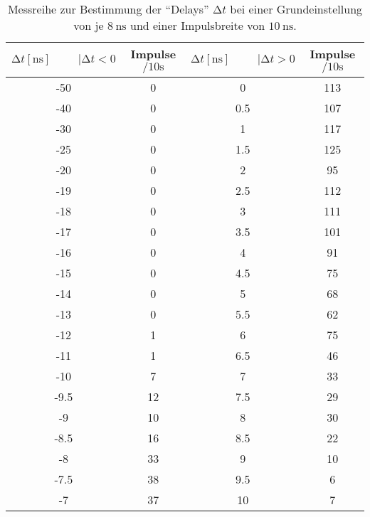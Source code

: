 \begin{table}
    \centering
    \caption{Messreihe zur Bestimmung der \enquote{Delays} $\increment t$ bei einer Grundeinstellung von je $\SI{8}{\nano\second}$ und einer Impulsbreite von $\SI{10}{\nano\second}$. } 
    \label{tab:MessreiheDelay10ns}
    \begin{tabular}{c c || c c}
        \toprule
        $\increment t [\si{\nano\second}] \hspace{1cm}|\increment t < 0 $ & Impulse $\si{\per{10}\second} $ & $\increment t [\si{\nano\second}] \hspace{1cm}|\increment t > 0 $ & Impulse $\si{\per{10}\second}$ \\
        \midrule
        -50    &   0      &    0       &   113    \\
        -40    &   0      &    0.5     &   107    \\
        -30    &   0      &    1       &   117    \\
        -25    &   0      &    1.5     &   125    \\
        -20    &   0      &    2       &   95    \\
        -19    &   0      &    2.5     &   112    \\
        -18    &   0      &    3       &   111    \\
        -17    &   0      &    3.5     &   101    \\
        -16    &   0      &    4       &   91    \\
        -15    &   0      &    4.5     &   75    \\
        -14    &   0      &    5       &   68    \\
        -13    &   0      &    5.5     &   62    \\
        -12    &   1      &    6       &   75    \\
        -11    &   1      &    6.5     &   46    \\
        -10    &   7      &    7       &   33    \\
        -9.5   &   12     &    7.5     &   29    \\
        -9     &   10     &    8       &   30    \\
        -8.5   &   16     &    8.5     &   22    \\
        -8     &   33     &    9       &   10    \\
        -7.5   &   38     &    9.5     &   6    \\
        -7     &   37     &    10      &   7    \\

\end{tabular}
\end{table}
